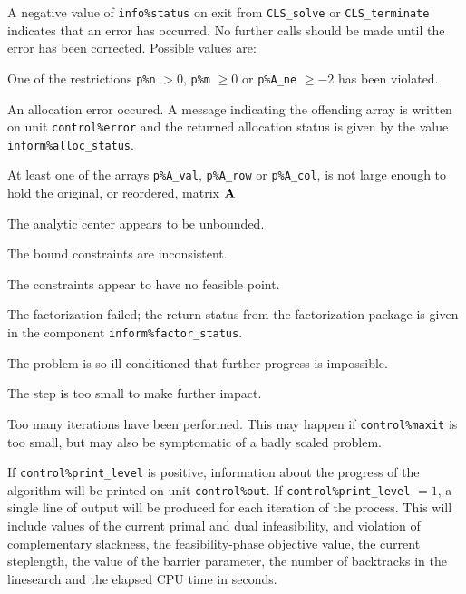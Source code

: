 \documentclass{galahad}
\newcommand{\packagename}{CLS}
\begin{document}

\galerrors
A negative value of {\tt info\%status} on exit from 
{\tt \packagename\_solve}
or 
{\tt \packagename\_terminate}
indicates that an error has occurred. No further calls should be made
until the error has been corrected. Possible values are:

\begin{description}

 One of the restrictions {\tt p\%n} $> 0$, {\tt p\%m} $\geq  0$ or
    {\tt p\%A\_ne} $\geq -2$ has been violated.

 An allocation error occured. A message indicating the offending 
 array is written on unit {\tt control\%error} and the returned allocation 
 status is given by the value {\tt inform\%alloc\_status}.

 At least one of the arrays 
 {\tt p\%A\_val}, {\tt p\%A\_row} or {\tt p\%A\_col},
 is not large enough to hold the original, or reordered, matrix ${\mathbf{A}}$

 The analytic center appears to be unbounded.

 The bound constraints are inconsistent.

 The constraints appear to have no feasible point.

 The factorization failed; the return status from the factorization
    package is given in the component {\tt inform\%fac\-t\-or\_status}.

 The problem is so ill-conditioned that further progress is impossible.

 The step is too small to make further impact.

 Too many iterations have been performed. This may happen if
    {\tt control\%maxit} is too small, but may also be symptomatic of 
    a badly scaled problem.

\end{description}


\galinfo
If {\tt control\%print\_level} is positive, information about the progress 
of the algorithm will be printed on unit {\tt control\-\%out}.
If {\tt control\%print\_level} $= 1$, a single line of output will be produced 
for each iteration of the process. 
This will include values of the current primal and dual infeasibility, and
violation of complementary slackness, the feasibility-phase objective value,
the current steplength, the value of the barrier parameter, the
number of backtracks in the linesearch and the elapsed CPU time in seconds.
\end{document}
